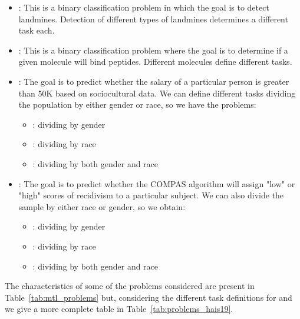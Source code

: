 \begin{itemize}
    \item {}: This is a binary classification problem in which the goal is to detect landmines. Detection of different types of landmines determines a different task each. 
    \item {}: This is a binary classification problem where the goal is to determine if a given molecule will bind peptides. Different molecules define different tasks.
    \item {}: The goal is to predict whether the salary of a particular person is greater than 50K based on sociocultural data. We can define different tasks dividing the population by either gender or race, so we have the problems:
    \begin{itemize}
        \item {}: dividing by gender
        \item {}: dividing by race
        \item {}: dividing by both gender and race
    \end{itemize}
    \item {}: The goal is to predict whether the COMPAS algorithm will assign "low" or "high" scores of recidivism to a particular subject. We can also divide the sample by either race or gender, so we obtain:
    \begin{itemize}
        \item {}: dividing by gender
        \item {}: dividing by race
        \item {}: dividing by both gender and race
    \end{itemize}
\end{itemize}
The characteristics of some of the problems considered are present in Table~\ref{tab:mtl_problems} but, considering the different task definitions for  and  we give a more complete table in Table~\ref{tab:problems_hais19}.


